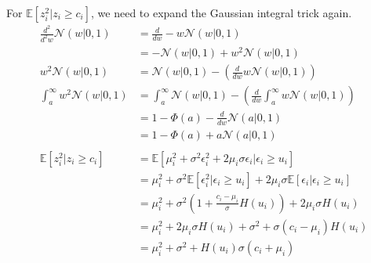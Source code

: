 \documentclass[11pt, letterpaper]{article}
\begin{document}
For $\mathbb{E}[z_i^2|z_i\geq c_i]$, we need to expand the Gaussian integral trick again.
\begin{align*}
     \frac{d^2}{d^2w} \mathcal{N}(w|0,1) &= \frac{d}{dw} -w\mathcal{N}(w|0,1) \\
        &= -\mathcal{N}(w|0,1) + w^2\mathcal{N}(w|0,1) \\
    w^2\mathcal{N}(w|0,1) &= \mathcal{N}(w|0,1) -(\frac{d}{dw} w\mathcal{N}(w|0,1)) \\
    \int_a^{\infty} w^2\mathcal{N}(w|0,1) &= \int_a^{\infty} \mathcal{N}(w|0,1) -(\frac{d}{dw} \int_a^{\infty} w\mathcal{N}(w|0,1)) \\
        &= 1 - \Phi(a) - \frac{d}{dw} \mathcal{N}(a|0,1) \\
        &= 1 - \Phi(a) + a \mathcal{N}(a|0,1) \\ \\
    \mathbb{E}[z_i^2|z_i \geq c_i] &= \mathbb{E}[\mu_i^2 + \sigma^2\epsilon_i^2 + 2\mu_i\sigma\epsilon_i|\epsilon_i \geq u_i] \\
        &= \mu_i^2 + \sigma^2\mathbb{E}[\epsilon_i^2|\epsilon_i \geq u_i] + 2\mu_i\sigma\mathbb{E}[\epsilon_i|\epsilon_i \geq u_i] \\
        &= \mu_i^2 + \sigma^2(1+\frac{c_i-\mu_i}{\sigma}H(u_i)) + 2\mu_i\sigma H(u_i) \\
        &= \mu_i^2 + 2\mu_i\sigma H(u_i) + \sigma^2 + \sigma(c_i-\mu_i)H(u_i) \\
        &= \mu_i^2 + \sigma^2 + H(u_i)\sigma(c_i + \mu_i)
\end{align*}
\end{document}
